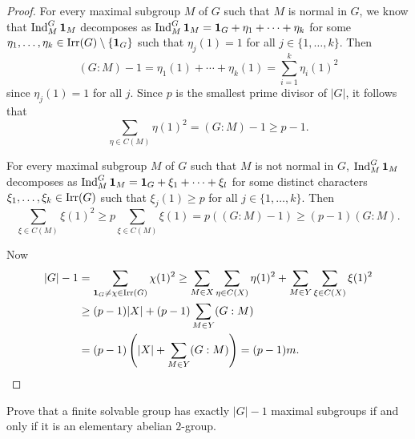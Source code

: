 \begin{proof}
   For every maximal subgroup $M$ of $G$ such that $M$ is normal in $G$, 
   we know that $\operatorname{Ind}_M^G\mathbf{1}_M$ decomposes 
   as $\operatorname{Ind}_M^G\mathbf{1}_M=\mathbf{1}_G+\eta_1+\cdots+\eta_k$ for some  
   $\eta_1,\dots,\eta_k\in\operatorname{Irr}(G)\setminus\{\mathbf{1}_G\}$ such that 
   $\eta_j(1)=1$ for all $j\in\{1,\dots,k\}$. Then
   \[
   (G:M)-1=\eta_1(1)+\cdots+\eta_k(1)=\sum_{i=1}^k\eta_i(1)^2
   \]
   since $\eta_j(1)=1$ for all $j$. Since $p$ is the smallest prime divisor of $|G|$, 
   it follows that 
   \[
   \sum_{\eta\in C(M)}\eta(1)^2
   =(G:M)-1\geq p-1.
   \]

   For every maximal subgroup $M$ of $G$ such that $M$ is not normal in $G$, 
   $\operatorname{Ind}_M^G\mathbf{1}_M$ decomposes 
   as $\operatorname{Ind}_M^G\mathbf{1}_M=\mathbf{1}_G+\xi_1+\cdots+\xi_l$ for some distinct characters 
   $\xi_1,\dots,\xi_k\in\operatorname{Irr}(G)$ 
   such that $\xi_j(1)\geq p$ for all $j\in\{1,\dots,k\}$. 
   Then 
   \[
   \sum_{\xi\in C(M)}\xi(1)^2
   \geq p\sum_{\xi\in C(M)}\xi(1)
   =p((G:M)-1)
   \geq (p-1)(G:M).
   \]

   Now 
   \begin{align*}
    |G|-1 &=\sum_{\mathbf{1}_G\ne\chi\in\operatorname{Irr}(G)}\chi(1)^2
    \geq\sum_{M\in X}\sum_{\eta\in C(X)}\eta(1)^2
    +\sum_{M\in Y}\sum_{\xi\in C(X)}\xi(1)^2\\
    &\geq (p-1)|X|+(p-1)\sum_{M\in Y}(G:M)\\
    &=(p-1)\left(|X|+\sum_{M\in Y}(G:M)\right)=(p-1)m.\qedhere 
   \end{align*}
\end{proof}

\begin{exercise}
    Prove that a finite solvable group has exactly $|G|-1$ maximal subgroups
    if and only if it is an elementary abelian $2$-group. 
\end{exercise}


